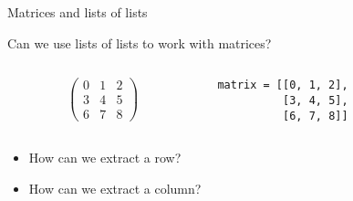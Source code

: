 \begin{frame}[fragile, t]{Matrices and lists of lists}
 
 \vspace{0.3truecm}
 Can we use lists of lists to work with matrices?

 \begin{columns}
  \begin{column}{0.4\linewidth}
   \begin{displaymath}
    \begin{pmatrix}
     0 & 1 & 2\\
     3 & 4 & 5\\
     6 & 7 & 8
    \end{pmatrix}
   \end{displaymath}
  \end{column}%
  \begin{column}{0.6\linewidth}
   \begin{center}
    \begin{lstlisting}
matrix = [[0, 1, 2],
          [3, 4, 5],
          [6, 7, 8]]
    \end{lstlisting}

    \vspace{\baselineskip}
   \end{center}
  \end{column}
 \end{columns}
 \begin{itemize}
  \item How can we extract a row? 
  \item How can we extract a column? 
 \end{itemize}

\end{frame}

